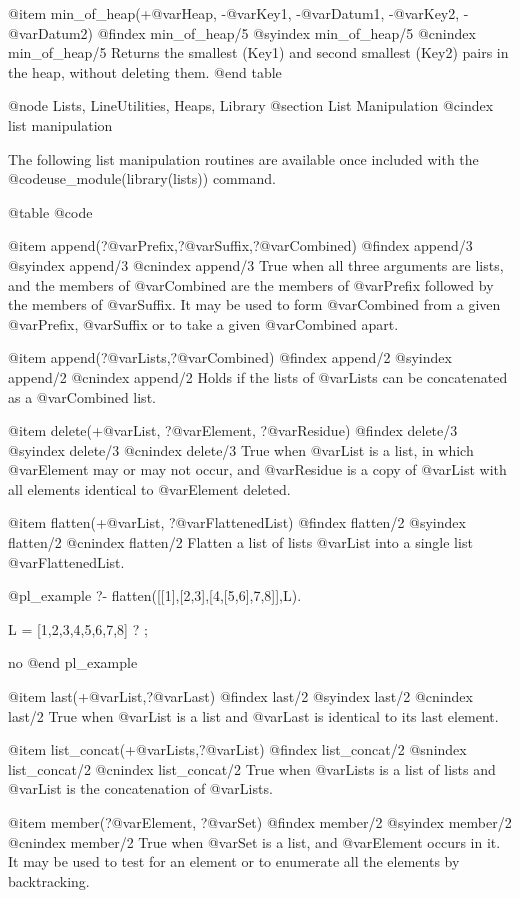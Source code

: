 @item min_of_heap(+@var{Heap},  -@var{Key1},  -@var{Datum1},
-@var{Key2},  -@var{Datum2})
@findex min_of_heap/5
@syindex min_of_heap/5
@cnindex min_of_heap/5
Returns the smallest (Key1) and second smallest (Key2) pairs in the
heap, without deleting them.
@end table

@node Lists, LineUtilities, Heaps, Library
@section List Manipulation
@cindex list manipulation

The following list manipulation routines are available once included
with the @code{use_module(library(lists))} command. 

@table @code

@item append(?@var{Prefix},?@var{Suffix},?@var{Combined})
@findex append/3
@syindex append/3
@cnindex append/3
True when all three arguments are lists, and the members of
@var{Combined} are the members of @var{Prefix} followed by the members of @var{Suffix}.
It may be used to form @var{Combined} from a given @var{Prefix}, @var{Suffix} or to take
a given @var{Combined} apart.

@item append(?@var{Lists},?@var{Combined})
@findex append/2
@syindex append/2
@cnindex append/2
Holds if the lists of @var{Lists} can be concatenated as a
@var{Combined} list.

@item delete(+@var{List}, ?@var{Element}, ?@var{Residue})
@findex delete/3
@syindex delete/3
@cnindex delete/3
True when @var{List} is a list, in which @var{Element} may or may not
occur, and @var{Residue} is a copy of @var{List} with all elements
identical to @var{Element} deleted.

@item flatten(+@var{List}, ?@var{FlattenedList})
@findex flatten/2
@syindex flatten/2
@cnindex flatten/2
Flatten a list of lists @var{List} into a single list
@var{FlattenedList}.

@pl_example
?- flatten([[1],[2,3],[4,[5,6],7,8]],L).

L = [1,2,3,4,5,6,7,8] ? ;

no
@end pl_example

@item last(+@var{List},?@var{Last})
@findex last/2
@syindex last/2
@cnindex last/2
True when @var{List} is a list and @var{Last} is identical to its last element.

@item list_concat(+@var{Lists},?@var{List})
@findex list_concat/2
@snindex list_concat/2
@cnindex list_concat/2
True when @var{Lists} is a list of lists and @var{List} is the
concatenation of @var{Lists}.

@item member(?@var{Element}, ?@var{Set})
@findex member/2
@syindex member/2
@cnindex member/2
True when @var{Set} is a list, and @var{Element} occurs in it.  It may be used
to test for an element or to enumerate all the elements by backtracking.

